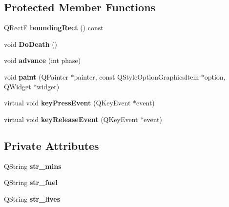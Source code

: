 \subsection*{Protected Member Functions}
\begin{DoxyCompactItemize}
\item 
\hypertarget{classbackground_a746278e2456ba524c747b629ce5a084d}{Q\-Rect\-F {\bfseries bounding\-Rect} () const }\label{classbackground_a746278e2456ba524c747b629ce5a084d}

\item 
\hypertarget{classbackground_aaf9de8b66b7715b6373ee83b4ab52f11}{void {\bfseries Do\-Death} ()}\label{classbackground_aaf9de8b66b7715b6373ee83b4ab52f11}

\item 
\hypertarget{classbackground_a920dc4b1432d7b9d00c6637f7c1798b1}{void {\bfseries advance} (int phase)}\label{classbackground_a920dc4b1432d7b9d00c6637f7c1798b1}

\item 
\hypertarget{classbackground_a37489a89173f3e114aef0228245b6e73}{void {\bfseries paint} (Q\-Painter $\ast$painter, const Q\-Style\-Option\-Graphics\-Item $\ast$option, Q\-Widget $\ast$widget)}\label{classbackground_a37489a89173f3e114aef0228245b6e73}

\item 
\hypertarget{classbackground_ae56e6e75013c80f83e8d82789af5ccc7}{virtual void {\bfseries key\-Press\-Event} (Q\-Key\-Event $\ast$event)}\label{classbackground_ae56e6e75013c80f83e8d82789af5ccc7}

\item 
\hypertarget{classbackground_ac09afb24f88ccc2c1878a282d01c16a1}{virtual void {\bfseries key\-Release\-Event} (Q\-Key\-Event $\ast$event)}\label{classbackground_ac09afb24f88ccc2c1878a282d01c16a1}

\end{DoxyCompactItemize}
\subsection*{Private Attributes}
\begin{DoxyCompactItemize}
\item 
\hypertarget{classbackground_a81b5ffc16339465f94e0f7ee47f84e7c}{Q\-String {\bfseries str\-\_\-mins}}\label{classbackground_a81b5ffc16339465f94e0f7ee47f84e7c}

\item 
\hypertarget{classbackground_a9e0e1509f02aa5da66710736665885d0}{Q\-String {\bfseries str\-\_\-fuel}}\label{classbackground_a9e0e1509f02aa5da66710736665885d0}

\item 
\hypertarget{classbackground_a324ba07a8a40473878b7f0d282214342}{Q\-String {\bfseries str\-\_\-lives}}\label{classbackground_a324ba07a8a40473878b7f0d282214342}

\end{DoxyCompactItemize}


